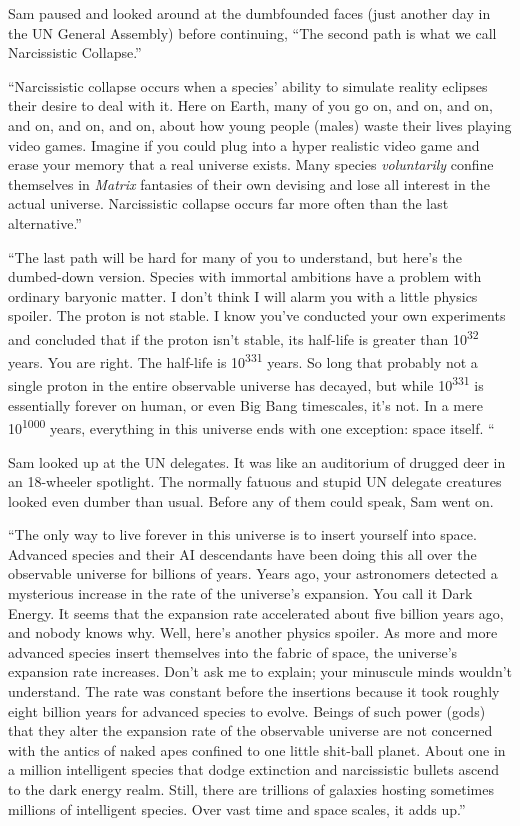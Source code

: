Sam paused and looked around at the dumbfounded faces (just another day
in the UN General Assembly) before continuing, ``The second path is what
we call Narcissistic Collapse.''

``Narcissistic collapse occurs when a species' ability to simulate
reality eclipses their desire to deal with it. Here on Earth, many of
you go on, and on, and on, and on, and on, and on, about how young
people (males) waste their lives playing video games. Imagine if you
could plug into a hyper realistic video game and erase your memory that
a real universe exists. Many species \emph{voluntarily} confine
themselves in \emph{Matrix} fantasies of their own devising and lose all
interest in the actual universe. Narcissistic collapse occurs far more
often than the last alternative.''

``The last path will be hard for many of you to understand, but here's
the dumbed-down version. Species with immortal ambitions have a problem
with ordinary baryonic matter. I don't think I will alarm you with a
little physics spoiler. The proton is not stable. I know you've
conducted your own experiments and concluded that if the proton isn't
stable, its half-life is greater than 10\textsuperscript{32} years. You
are right. The half-life is 10\textsuperscript{331} years. So long that
probably not a single proton in the entire observable universe has
decayed, but while 10\textsuperscript{331} is essentially forever on
human, or even Big Bang timescales, it's not. In a mere
10\textsuperscript{1000} years, everything in this universe ends with
one exception: space itself. ``

Sam looked up at the UN delegates. It was like an auditorium of drugged
deer in an 18-wheeler spotlight. The normally fatuous and stupid UN
delegate creatures looked even dumber than usual. Before any of them
could speak, Sam went on.

``The only way to live forever in this universe is to insert yourself
into space. Advanced species and their AI descendants have been doing
this all over the observable universe for billions of years. Years ago,
your astronomers detected a mysterious increase in the rate of the
universe's expansion. You call it Dark Energy. It seems that the
expansion rate accelerated about five billion years ago, and nobody
knows why. Well, here's another physics spoiler. As more and more
advanced species insert themselves into the fabric of space, the
universe's expansion rate increases. Don't ask me to explain; your
minuscule minds wouldn't understand. The rate was constant before the
insertions because it took roughly eight billion years for advanced
species to evolve. Beings of such power (gods) that they alter the
expansion rate of the observable universe are not concerned with the
antics of naked apes confined to one little shit-ball planet. About one
in a million intelligent species that dodge extinction and narcissistic
bullets ascend to the dark energy realm. Still, there are trillions of
galaxies hosting sometimes millions of intelligent species. Over vast
time and space scales, it adds up.''

